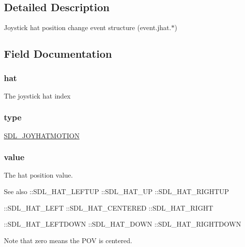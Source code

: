 \subsection{Detailed Description}
Joystick hat position change event structure (event.\+jhat.$\ast$) 

\subsection{Field Documentation}
\subsubsection[{\texorpdfstring{hat}{hat}}]{ hat}\hypertarget{struct_s_d_l___joy_hat_event_a6ba9d2ca9d3fcb96dd9d63af1f70b785}{}\label{struct_s_d_l___joy_hat_event_a6ba9d2ca9d3fcb96dd9d63af1f70b785}
The joystick hat index 
\subsubsection[{\texorpdfstring{type}{type}}]{ type}\hypertarget{struct_s_d_l___joy_hat_event_aa40a9b05c3154032b9f2d7220e9f08dc}{}\label{struct_s_d_l___joy_hat_event_aa40a9b05c3154032b9f2d7220e9f08dc}
\hyperlink{_s_d_l__events_8h_a3b589e89be6b35c02e0dd34a55f3fccaafba4080bfbad335e520097b2024f0dff}{S\+D\+L\+\_\+\+J\+O\+Y\+H\+A\+T\+M\+O\+T\+I\+ON} 
\subsubsection[{\texorpdfstring{value}{value}}]{ value}\hypertarget{struct_s_d_l___joy_hat_event_aa4f4dc93a5c52b0806c5844196244e51}{}\label{struct_s_d_l___joy_hat_event_aa4f4dc93a5c52b0806c5844196244e51}
The hat position value. \begin{DoxySeeAlso}{See also}
\+::\+S\+D\+L\+\_\+\+H\+A\+T\+\_\+\+L\+E\+F\+T\+UP \+::\+S\+D\+L\+\_\+\+H\+A\+T\+\_\+\+UP \+::\+S\+D\+L\+\_\+\+H\+A\+T\+\_\+\+R\+I\+G\+H\+T\+UP 

\+::\+S\+D\+L\+\_\+\+H\+A\+T\+\_\+\+L\+E\+FT \+::\+S\+D\+L\+\_\+\+H\+A\+T\+\_\+\+C\+E\+N\+T\+E\+R\+ED \+::\+S\+D\+L\+\_\+\+H\+A\+T\+\_\+\+R\+I\+G\+HT 

\+::\+S\+D\+L\+\_\+\+H\+A\+T\+\_\+\+L\+E\+F\+T\+D\+O\+WN \+::\+S\+D\+L\+\_\+\+H\+A\+T\+\_\+\+D\+O\+WN \+::\+S\+D\+L\+\_\+\+H\+A\+T\+\_\+\+R\+I\+G\+H\+T\+D\+O\+WN
\end{DoxySeeAlso}
Note that zero means the P\+OV is centered. 
